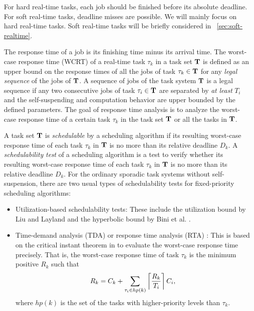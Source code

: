 For hard real-time tasks, each job should be finished before its
absolute deadline. For soft real-time tasks, deadline misses are
possible. We will mainly focus on hard real-time tasks. 
Soft real-time tasks will be briefly considered in
\mysectionref{}~\ref{sec:soft-realtime}.

The response time of a job is its finishing time minus its arrival
time.  The worst-case response time (WCRT) of a real-time task
$\tau_k$ in a task set ${\bf T}$ is defined as an upper bound on the
response times of all the jobs of task $\tau_k \in {\bf T}$ for any
\emph{legal sequence} of the jobs of ${\bf T}$. A sequence of jobs of
the task system ${\bf T}$ is a legal sequence if any two consecutive
jobs of task $\tau_i \in {\bf T}$ are separated by \emph{at least}
$T_i$ and the self-suspending and computation behavior are upper
bounded by the defined parameters. The goal of response time analysis is to
analyze the worst-case response time of a certain task $\tau_k$ in the
task set ${\bf T}$ or all the tasks in ${\bf T}$.

A task set ${\bf T}$ is \emph{schedulable} by a scheduling algorithm if its resulting worst-case response time of each task 
$\tau_k$ in ${\bf T}$ is no more than its relative deadline $D_k$.
A \emph{schedulability test} of a scheduling algorithm is a test to
verify whether its resulting worst-case response time of each task
$\tau_k$ in ${\bf T}$ is no more than its relative deadline $D_k$. For
the ordinary sporadic task systems without self-suspension, there are
two usual types of schedulability tests for fixed-priority scheduling
algorithms:
\begin{itemize}
\item Utilization-based schedulability tests: These include the
  utilization bound by Liu and Layland \cite{Liu_1973}  and the
  hyperbolic bound by Bini et al. \cite{bini2003rate}.
\item Time-demand analysis (TDA) or response time analysis (RTA) \cite{lehoczky-1989}: This is based on the critical instant
  theorem in
  \cite{Liu_1973} to evaluate the worst-case response time
  precisely. That is, the worst-case response time of task $\tau_k$ is
  the minimum positive $R_k$ such that
  \begin{equation}
   \label{eq:rta}
  R_k = C_k+ \sum_{\tau_i \in hp(k)}\left\lceil{\frac{R_k}{T_i}}\right\rceil C_i,     
  \end{equation}
  where $hp(k)$ is the set of the tasks with higher-priority levels
  than $\tau_k$.  
\end{itemize}


